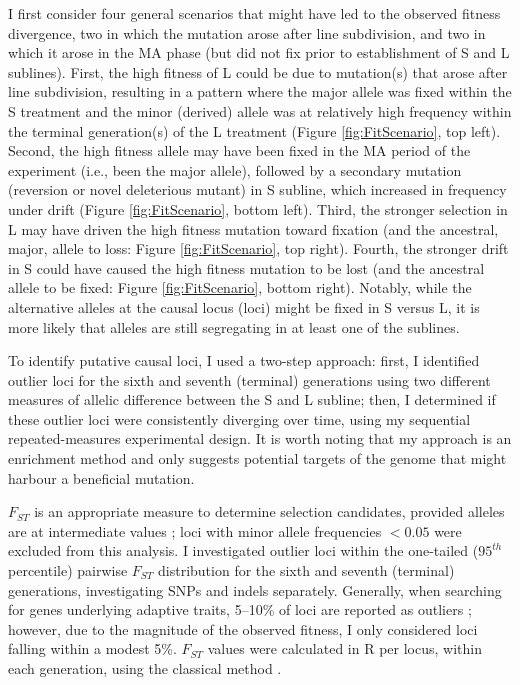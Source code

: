 I first consider four general scenarios that might have led to the observed fitness divergence, two in which the mutation arose after line subdivision, and two in which it arose in the MA phase (but did not fix prior to establishment of S and L sublines). First, the high fitness of L could be due to mutation(s) that arose after line subdivision, resulting in a pattern where the major allele was fixed within the S treatment and the minor (derived) allele was at relatively high frequency within the terminal generation(s) of the L treatment (Figure \ref{fig:FitScenario}, top left). Second, the high fitness allele may have been fixed in the MA period of the experiment (i.e., been the major allele), followed by a secondary mutation (reversion or novel deleterious mutant) in S subline, which increased in frequency under drift (Figure \ref{fig:FitScenario}, bottom left). Third, the stronger selection in L may have driven the high fitness mutation toward fixation (and the ancestral, major, allele to loss: Figure \ref{fig:FitScenario}, top right). Fourth, the stronger drift in S could have caused the high fitness mutation to be lost (and the ancestral allele to be fixed: Figure \ref{fig:FitScenario}, bottom right). Notably, while the alternative alleles at the causal locus (loci) might be fixed in S versus L, it is more likely that alleles are still segregating in at least one of the sublines.\par

To identify putative causal loci, I used a two-step approach: first, I identified outlier loci for the sixth and seventh (terminal) generations using two different measures of allelic difference between the S and L subline; then, I determined if these outlier loci were consistently diverging over time, using my sequential repeated-measures experimental design. It is worth noting that my approach is an enrichment method and only suggests potential targets of the genome that might harbour a beneficial mutation. \par

$F_{ST}$ is an appropriate measure to determine selection candidates, provided alleles are at intermediate values \citep[MAF $\geq$ 0.05,][]{Bern19}; loci with minor allele frequencies $< 0.05$ were excluded from this analysis. I investigated outlier loci within the one-tailed ($95^{th}$ percentile) pairwise $F_{ST}$ distribution for the sixth and seventh (terminal) generations, investigating SNPs and indels separately. Generally, when searching for genes underlying adaptive traits, 5–10\% of loci are reported as outliers \citep{Stin08, Nosi09}; however, due to the magnitude of the observed fitness, I only considered loci falling within a modest 5\%. $F_{ST}$ values were calculated in R \citep[v 4.2.2,][]{R} per locus, within each generation, using the classical method \citep{Weir84,Hart97}.\par
 
